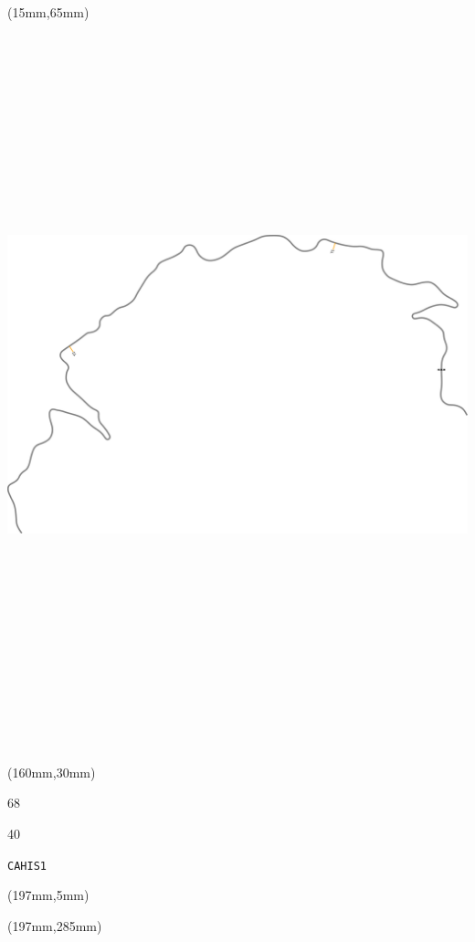 \begin{textblock*}{185mm}(15mm,65mm)%
\centering
\mbox{\includegraphics[width=185mm,height=210mm,keepaspectratio]{PT/CAHIS1.pdf}}
\end{textblock*}
\begin{textblock*}{40mm}(160mm,30mm)%
\Large
\par{} 
\par68 
\par40 
\par\hfill\tiny\tt CAHIS1\\
\end{textblock*}
\begin{textblock*}{20mm}(197mm,5mm)%
\fbox{\thepage}
\label{CAHIS1}
\end{textblock*}
\begin{textblock*}{20mm}(197mm,285mm)%
\fbox{\thepage}
\end{textblock*}

